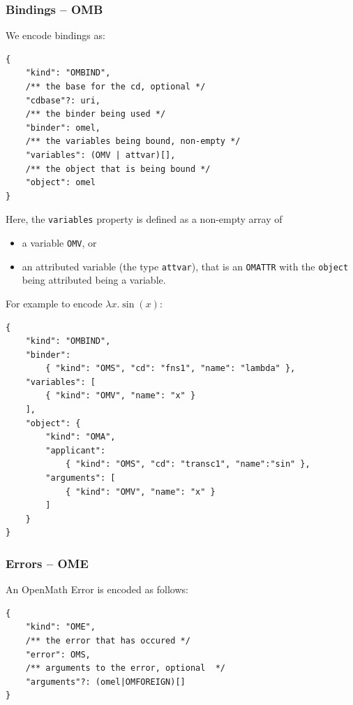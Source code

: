 \subsubsection{Bindings -- OMB}

We encode bindings as:
\\\begin{minipage}{\linewidth}\begin{lstlisting}
{
    "kind": "OMBIND", 
    /** the base for the cd, optional */
    "cdbase"?: uri, 
    /** the binder being used */
    "binder": omel,
    /** the variables being bound, non-empty */
    "variables": (OMV | attvar)[],
    /** the object that is being bound */
    "object": omel
}
\end{lstlisting}\end{minipage}

Here, the \texttt{variables} property is defined as a non-empty array of
\begin{itemize}
    \item a variable \texttt{OMV}, or
    \item an attributed variable (the type \texttt{attvar}), that is an \texttt{OMATTR} with the \texttt{object} being attributed being a variable. 
\end{itemize}

For example to encode $\lambda x . \sin(x)$:
\\\begin{minipage}{\linewidth}\begin{lstlisting}
{  
    "kind": "OMBIND",
    "binder": 
        { "kind": "OMS", "cd": "fns1", "name": "lambda" },
    "variables": [  
        { "kind": "OMV", "name": "x" }
    ],
    "object": {  
        "kind": "OMA",
        "applicant":
            { "kind": "OMS", "cd": "transc1", "name":"sin" },
        "arguments": [
            { "kind": "OMV", "name": "x" }
        ]
    }
}
\end{lstlisting}\end{minipage}

\subsubsection{Errors -- OME}

An OpenMath Error is encoded as follows:
\\\begin{minipage}{\linewidth}\begin{lstlisting}
{
    "kind": "OME", 
    /** the error that has occured */
    "error": OMS,
    /** arguments to the error, optional  */
    "arguments"?: (omel|OMFOREIGN)[]
}
\end{lstlisting}\end{minipage}

